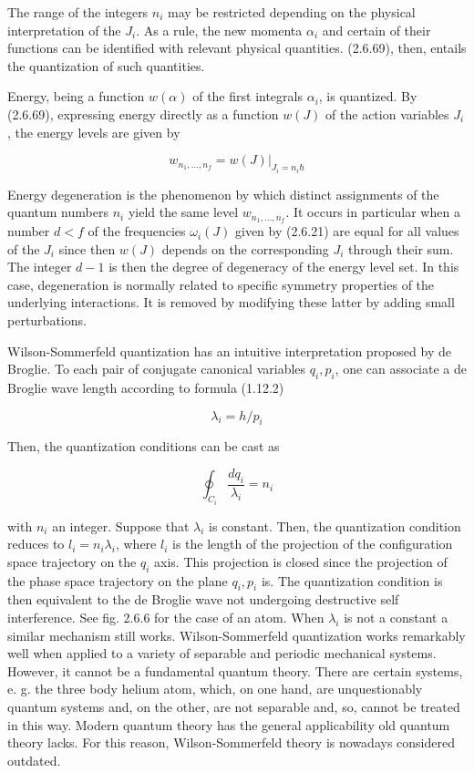 \documentclass{article}
\begin{document}
The range of the integers $n_{i}$ may be restricted depending on the physical interpretation of the $J_{i}$. As a rule, the new momenta $\alpha_{i}$ and certain of their functions can be identified with relevant physical quantities. (2.6.69), then, entails the quantization of such quantities.

Energy, being a function $w(\alpha)$ of the first integrals $\alpha_{i}$, is quantized. By (2.6.69), expressing energy directly as a function $w(J)$ of the action variables $J_{i}$, the energy levels are given by
 
\begin{equation*}
w_{n_{1}, \ldots, n_{f}}=\left.w(J)\right|_{J_{i}=n_{i} \hbar} \tag{2.6.70}
\end{equation*}
 

Energy degeneration is the phenomenon by which distinct assignments of the quantum numbers $n_{i}$ yield the same level $w_{n_{1}, \ldots, n_{f}}$. It occurs in particular when a number $d<f$ of the frequencies $\omega_{i}(J)$ given by (2.6.21) are equal for all values of the $J_{i}$ since then $w(J)$ depends on the corresponding $J_{i}$ through their sum. The integer $d-1$ is then the degree of degeneracy of the energy level set. In this case, degeneration is normally related to specific symmetry properties of the underlying interactions. It is removed by modifying these latter by adding small perturbations.

Wilson-Sommerfeld quantization has an intuitive interpretation proposed by de Broglie. To each pair of conjugate canonical variables $q_{i}, p_{i}$, one can associate a de Broglie wave length according to formula (1.12.2)
 
\begin{equation*}
\lambda_{i}=h / p_{i} \tag{2.6.71}
\end{equation*}
 

Then, the quantization conditions can be cast as
 
\begin{equation*}
\oint_{C_{i}} \frac{d q_{i}}{\lambda_{i}}=n_{i} \tag{2.6.72}
\end{equation*}
 
with $n_{i}$ an integer. Suppose that $\lambda_{i}$ is constant. Then, the quantization condition reduces to $l_{i}=n_{i} \lambda_{i}$, where $l_{i}$ is the length of the projection of the configuration space trajectory on the $q_{i}$ axis. This projection is closed since the projection of the phase space trajectory on the plane $q_{i}, p_{i}$ is. The quantization condition is then equivalent to the de Broglie wave not undergoing destructive self interference. See fig. 2.6.6 for the case of an atom. When $\lambda_{i}$ is not a constant a similar mechanism still works. Wilson-Sommerfeld quantization works remarkably well when applied to a variety of separable and periodic mechanical systems. However, it cannot be a fundamental quantum theory. There are certain systems, e. g. the three body helium atom, which, on one hand, are unquestionably quantum systems and, on the other, are not separable and, so, cannot be treated in this way. Modern quantum theory has the general applicability old quantum theory lacks. For this reason, Wilson-Sommerfeld theory is nowadays considered outdated.
\end{document}
